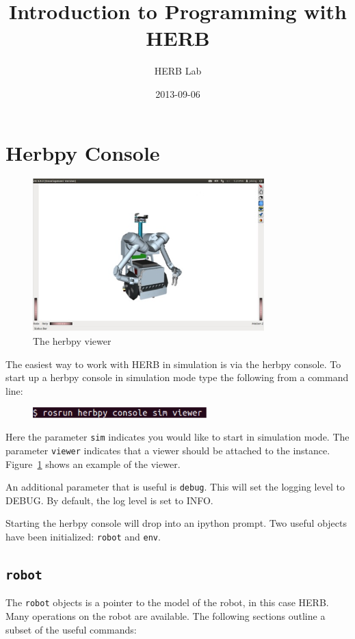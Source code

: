 \documentclass[11pt, oneside]{article}
\title{Introduction to Programming with HERB}
\author{HERB Lab}
\date{2013-09-06} %
\begin{document}
\maketitle


\section{Herbpy Console}
\begin{figure}[htbp]
   \centering
   \includegraphics[width=0.8\textwidth]{figs/viewer.jpg} %
   \caption{The herbpy viewer}
   \label{fig:viewer}
\end{figure}
The easiest way to work with HERB in simulation is via the herbpy console.  To start up a herbpy console in simulation mode type the following from a command line:
\begin{figure}[h]
\centering
\includegraphics[width=0.6\textwidth]{figs/herbpystart.jpg}
\end{figure}
Here the parameter \texttt{sim} indicates you would like to start in simulation mode. The parameter \texttt{viewer} indicates that a viewer should be attached to the instance.  Figure~\ref{fig:viewer} shows an example of the viewer.  

An additional parameter that is useful is \texttt{debug}.  This will set the logging level to DEBUG.  By default, the log level is set to INFO.

Starting the herbpy console will drop into an ipython prompt.  Two useful objects have been initialized: \texttt{robot} and \texttt{env}. 

\subsection{\texttt{robot}}
The \texttt{robot} objects is a pointer to the model of the robot, in this case HERB.  Many operations on the robot are available.  The following sections outline a subset of the useful commands:
\end{document}
